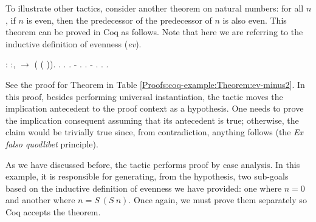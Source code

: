 To illustrate other tactics, consider another theorem on natural numbers: for all $ n $, if $ n $ is even, then the predecessor of the predecessor of $ n $ is also even. This theorem can be proved in Coq as follows. Note that here we are referring to the inductive definition of evenness (\emph{ev}).

\begin{coqdoccode}
	\coqdocnoindent
	  : \coqdockw{\ensuremath{\forall}} :,\coqdoceol
	\coqdocindent{1.00em}
	  \ensuremath{\rightarrow}  ( ( )).\coqdoceol
	\coqdocnoindent
	.\coqdoceol
	\coqdocindent{1.00em}
	.\coqdoceol
	\coqdocindent{1.00em}
	 .\coqdoceol
	\coqdocindent{1.00em}
	- .  .\coqdoceol
	\coqdocindent{1.00em}
	- .  .\coqdoceol
	\coqdocnoindent
	.\coqdoceol
\end{coqdoccode}

See the proof for Theorem  in Table \ref{Proofs:coq-example:Theorem:ev-minus2}. In this proof, besides performing universal instantiation, the tactic  moves the implication antecedent to the proof context as a hypothesis. One needs to prove the implication consequent assuming that its antecedent is true; otherwise, the claim would be trivially true since, from contradiction, anything follows (the \emph{Ex falso quodlibet} principle).

As we have discussed before, the tactic  performs proof by case analysis. In this example, it is responsible for generating, from the hypothesis, two sub-goals based on the inductive definition of evenness we have provided: one where $ n = 0 $ and another where $ n = S \ (S \ n) $. Once again, we must prove them separately so Coq accepts the theorem.

